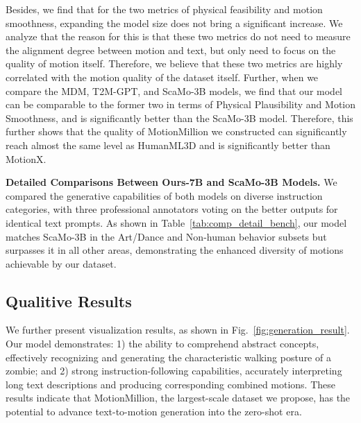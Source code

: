 Besides, we find that for the two metrics of physical feasibility and motion smoothness, expanding the model size does not bring a significant increase. We analyze that the reason for this is that these two metrics do not need to measure the alignment degree between motion and text, but only need to focus on the quality of motion itself. Therefore, we believe that these two metrics are highly correlated with the motion quality of the dataset itself. Further, when we compare the MDM, T2M-GPT, and ScaMo-3B models, we find that our model can be comparable to the former two in terms of Physical Plausibility and Motion Smoothness, and is significantly better than the ScaMo-3B model. Therefore, this further shows that the quality of MotionMillion we constructed can significantly reach almost the same level as HumanML3D and is significantly better than MotionX.

\noindent\textbf{Detailed Comparisons Between Ours-7B and ScaMo-3B Models.}
We compared the generative capabilities of both models on diverse instruction categories, with three professional annotators voting on the better outputs for identical text prompts. As shown in Table~\ref{tab:comp_detail_bench}, our model matches ScaMo-3B in the Art/Dance and Non-human behavior subsets but surpasses it in all other areas, demonstrating the enhanced diversity of motions achievable by our dataset.

\subsection{Qualitive Results}
We further present visualization results, as shown in Fig.~\ref{fig:generation_result}. Our model demonstrates: 1) the ability to comprehend abstract concepts, effectively recognizing and generating the characteristic walking posture of a zombie; and 2) strong instruction-following capabilities, accurately interpreting long text descriptions and producing corresponding combined motions. These results indicate that MotionMillion, the largest-scale dataset we propose, has the potential to advance text-to-motion generation into the zero-shot era.
